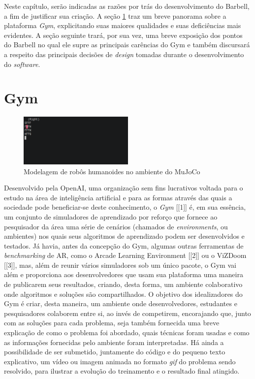 \documentclass[cic,tc]{iiufrgs}
\begin{document}

Neste capítulo, serão indicadas as razões por trás do desenvolvimento do
Barbell, a fim de justificar sua criação. A seção \ref{sec:gym} traz um breve
panorama sobre a plataforma \textit{Gym}, explicitando suas maiores qualidades e
suas deficiências mais evidentes. A seção seguinte trará, por sua vez, uma breve
exposição dos pontos do Barbell no qual ele supre as principais carências do
Gym e também discursará a respeito das principais decisões de \textit{design}
tomadas durante o desenvolvimento do \textit{software}.

\section{Gym}
\label{sec:gym}

\begin{figure}[h]
    \caption{Modelagem de robôs humanoides no ambiente do MuJoCo}
    \begin{center}
      \includegraphics[width=0.5\textwidth]{frozen_lake.png}
    \end{center}
    \label{fig:frozen_lake2s}
\end{figure}

Desenvolvido pela OpenAI, uma organização sem fins lucrativos voltada para o
estudo na área de inteligência artificial e para as formas através das quais a
sociedade pode beneficiar-se deste conhecimento, o \textit{Gym} [[1]] é, em sua
essência, um conjunto de simuladores de aprendizado por reforço que fornece ao
pesquisador da área uma série de cenários (chamados de \textit{environments}, ou
ambientes) nos quais seus algoritmos de aprendizado podem ser desenvolvidos e
testados. Já havia, antes da concepção do Gym, algumas outras ferramentas de
\textit{benchmarking} de AR, como o Arcade Learning Environment [[2]] ou o
ViZDoom [[3]], mas, além de reunir vários simuladores sob um único pacote, o Gym
vai além e proporciona aos desenvolvedores que usam sua plataforma uma maneira
de publicarem seus resultados, criando, desta forma, um ambiente
colaborativo onde algoritmos e soluções são compartilhados. O objetivo dos
idealizadores do Gym é criar, desta maneira, um ambiente onde desenvolvedores,
estudantes e pesquisadores colaborem entre si, ao invés de competirem,
encorajando que, junto com as soluções para cada problema, seja também fornecida
uma breve explicação de como o problema foi abordado, quais técnicas foram
usadas e como as informações fornecidas pelo ambiente foram interpretadas. Há
ainda a possibilidade de ser submetido, juntamente do código e do pequeno texto
explicativo, um vídeo ou imagem animada no formato \textit{gif} do problema
sendo resolvido, para ilustrar a evolução do treinamento e o resultado final
atingido.
\end{document}
